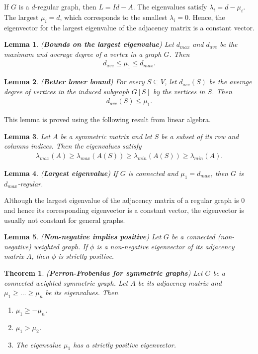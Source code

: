 \documentclass[]{article}
\newtheorem{theorem}{Theorem}[section]
\newtheorem{lemma}{Lemma}[section]
\begin{document}
	If $G$ is a $d$-regular graph, then $L = Id-A$. The eigenvalues satisfy $\lambda_i = d- \mu_i$. The largest $\mu_i=d$, which corresponds to the smallest $\lambda_i=0$. Hence, the eigenvector for the largest eigenvalue of the adjacency matrix is a constant vector. 
	
	\begin{lemma} (\textbf{Bounds on the largest eigenvalue})
		Let $d_{max}$ and $d_{ave}$ be the maximum and average degree of a vertex in a graph $G$. Then 
		\begin{align*}
		d_{ave} \le \mu_1 \le d_{max}.
		\end{align*}
	\end{lemma}
	
	\begin{lemma}(\textbf{Better lower bound})
		For every $S \subseteq V$, let $d_{ave}(S)$ be the average degree of vertices in the induced subgraph $G[S]$ by the vertices in $S$. Then 
		\begin{align*}
		d_{ave}(S) \le \mu_1.
		\end{align*}
	\end{lemma}
	This lemma is proved using the following result from linear algebra. 
	
	\begin{lemma}
		Let $A$ be a symmetric matrix and let $S$ be a subset of its row and columns indices. Then the eigenvalues satisfy  
		\begin{align*}
		\lambda_{max}(A) \ge \lambda_{max}(A(S)) \ge \lambda_{min}(A(S)) \ge \lambda_{min}(A).
		\end{align*}
	\end{lemma}
	
	\begin{lemma} (\textbf{Largest eigenvalue})
		If $G$ is connected and $\mu_1=d_{max}$, then $G$ is $d_{max}$-regular.
	\end{lemma}
	
	Although the largest eigenvalue of the adjacency matrix of a regular graph is 0 and hence its corresponding eigenvector is a constant vector, the eigenvector is usually not constant for general graphs. 
	
	
	\begin{lemma} (\textbf{Non-negative implies positive})
		Let $G$ be a connected (non-negative) weighted graph. If $\phi$ is a non-negative eigenvector of its adjacency matrix $A$, then $\phi$ is strictly positive. 
	\end{lemma}
	
	\begin{theorem} (\textbf{Perron-Frobenius for symmetric graphs})
		Let $G$ be a connected weighted symmetric graph. Let $A$ be its adjacency matrix and $\mu_1 \ge \dots \ge \mu_n$ be its eigenvalues. Then 
		\begin{enumerate}
			\item $\mu_1 \ge -\mu_n$.
			\item $\mu_1 > \mu_2$.
			\item The eigenvalue $\mu_1$ has a strictly positive eigenvector.
		\end{enumerate}
	\end{theorem}
	
\end{document}
